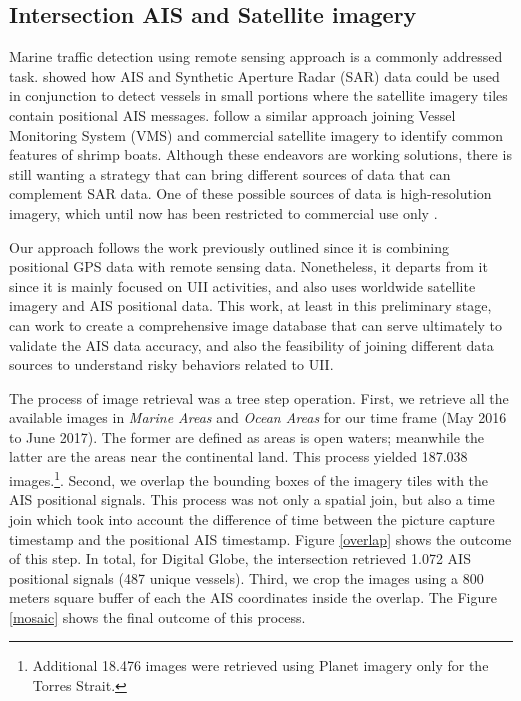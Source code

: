 \subsection{Intersection AIS and Satellite imagery}

Marine traffic detection using remote sensing approach is a commonly addressed task.  showed how 
AIS and Synthetic Aperture Radar (SAR) data could be used in conjunction to detect vessels in small portions where
the satellite imagery tiles contain positional AIS messages.  follow a similar approach joining
Vessel Monitoring System (VMS) and commercial satellite imagery to identify common features of shrimp boats. Although
these endeavors are working solutions, there is still wanting a strategy that can bring different sources of data that
can complement SAR data. One of these possible sources of data is high-resolution imagery, which until now has been 
restricted to commercial use only \cite{Greidanus2006}.

Our approach follows the work previously outlined since it is combining positional GPS data with remote sensing data. 
Nonetheless, it departs from it since it is mainly focused on UII activities, and also uses worldwide satellite imagery 
and AIS positional data. This work, at least in this preliminary stage, can work to create a comprehensive image 
database that can serve ultimately to validate the AIS data accuracy, and also the feasibility of joining different 
data sources to understand risky behaviors related to UII. 

The process of image retrieval was a tree step operation. First, we retrieve all the available images in \textit{Marine Areas} and
\textit{Ocean Areas} for our time frame (May 2016 to June 2017). The former are defined as areas is open waters; meanwhile the latter
are the areas near the continental land. This process yielded 187.038 images.\footnote{Additional 18.476 images were retrieved using 
Planet imagery only for the Torres Strait.}. Second, we overlap the bounding boxes of the imagery tiles with the AIS positional signals. 
This process was not only a spatial join, but also a time join which took into account the difference of time between the picture 
capture timestamp and the positional AIS timestamp. Figure \ref{overlap} shows the outcome of this step. In total, for Digital Globe,
the intersection retrieved 1.072 AIS positional signals (487 unique vessels). Third, we crop the images using a 800 meters square buffer 
of each the AIS coordinates inside the overlap. The Figure \ref{mosaic} shows the final outcome of this process.

